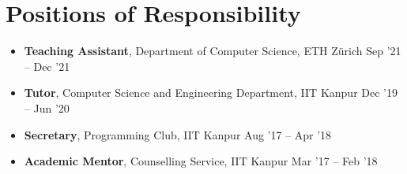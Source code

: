 \newcommand{\por}[3]{\textbf{#1}, #2 \hfill #3}

\section*{Positions of Responsibility}
\begin{itemize}

\setlength\itemsep{0pt}
\item \por{Teaching Assistant}{Department of Computer Science, ETH Zürich}{Sep '21 -- Dec '21}%
\item \por{Tutor}{Computer Science and Engineering Department, IIT Kanpur}{Dec '19 -- Jun '20}%
\item \por{Secretary}{Programming Club, IIT Kanpur}{Aug '17 -- Apr '18}%
\item \por{Academic Mentor}{Counselling Service, IIT Kanpur}{Mar '17 -- Feb '18}%

\end{itemize}
